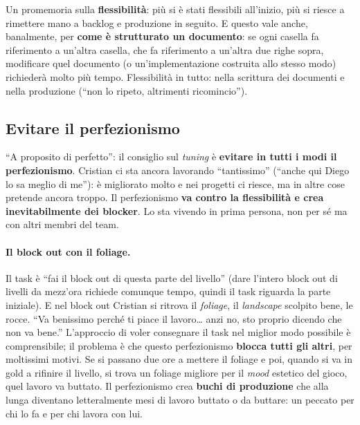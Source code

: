 Un promemoria sulla \textbf{flessibilità}: più si è stati flessibili all'inizio,
più si riesce a rimettere mano a backlog e produzione in seguito. E questo vale
anche, banalmente, per \textbf{come è strutturato un documento}: se ogni casella
fa riferimento a un'altra casella, che fa riferimento a un'altra due righe
sopra, modificare quel documento (o un'implementazione costruita allo stesso
modo) richiederà molto più tempo. Flessibilità in tutto: nella scrittura dei
documenti e nella produzione (``non lo ripeto, altrimenti ricomincio'').

\subsection{Evitare il perfezionismo}

``A proposito di perfetto'': il consiglio sul \emph{tuning} è \textbf{evitare
in tutti i modi il perfezionismo}. Cristian ci sta ancora lavorando
``tantissimo'' (``anche qui Diego lo sa meglio di me''): è migliorato molto e nei
progetti ci riesce, ma in altre cose pretende ancora troppo. Il perfezionismo
\textbf{va contro la flessibilità e crea inevitabilmente dei blocker}. Lo sta
vivendo in prima persona, non per sé ma con altri membri del team.

\paragraph{Il block out con il foliage.} Il task è ``fai il block out di questa
parte del livello'' (dare l'intero block out di livelli da mezz'ora richiede
comunque tempo, quindi il task riguarda la parte iniziale). E nel block out
Cristian si ritrova il \emph{foliage}, il \emph{landscape} scolpito bene, le
rocce. ``Va benissimo perché ti piace il lavoro\dots{} anzi no, sto proprio
dicendo che non va bene.'' L'approccio di voler consegnare il task nel miglior
modo possibile è comprensibile; il problema è che questo perfezionismo
\textbf{blocca tutti gli altri}, per moltissimi motivi. Se si passano due ore a
mettere il foliage e poi, quando si va in gold a rifinire il livello, si trova un
foliage migliore per il \emph{mood} estetico del gioco, quel lavoro va buttato.
Il perfezionismo crea \textbf{buchi di produzione} che alla lunga diventano
letteralmente mesi di lavoro buttato o da buttare: un peccato per chi lo fa e
per chi lavora con lui.

